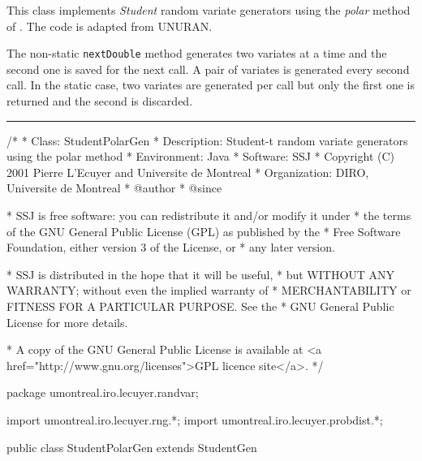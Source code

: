 
This class implements {\em Student\/} random variate generators using
 the {\em polar\/} method of \cite{rBAI94a}.
The code is adapted from UNURAN.

The non-static \texttt{nextDouble} method generates two variates at a time
and the second one is saved for the next call.  
A pair of variates is generated every second call. 
In the static case, two variates are generated per
call but only the first one is returned and the second is discarded.

\bigskip\hrule

\begin{code}
\begin{hide}
/*
 * Class:        StudentPolarGen
 * Description:  Student-t random variate generators using the polar method
 * Environment:  Java
 * Software:     SSJ 
 * Copyright (C) 2001  Pierre L'Ecuyer and Universite de Montreal
 * Organization: DIRO, Universite de Montreal
 * @author       
 * @since

 * SSJ is free software: you can redistribute it and/or modify it under
 * the terms of the GNU General Public License (GPL) as published by the
 * Free Software Foundation, either version 3 of the License, or
 * any later version.

 * SSJ is distributed in the hope that it will be useful,
 * but WITHOUT ANY WARRANTY; without even the implied warranty of
 * MERCHANTABILITY or FITNESS FOR A PARTICULAR PURPOSE.  See the
 * GNU General Public License for more details.

 * A copy of the GNU General Public License is available at
   <a href="http://www.gnu.org/licenses">GPL licence site</a>.
 */
\end{hide}
package umontreal.iro.lecuyer.randvar;\begin{hide}
import umontreal.iro.lecuyer.rng.*;
import umontreal.iro.lecuyer.probdist.*;
\end{hide}

public class StudentPolarGen extends StudentGen \begin{hide} {

    private boolean available = false;
    private double[] variates = new double[2];
    private static double[] staticVariates = new double[2];
    // Used by the polar method.
\end{hide}\end{code}

